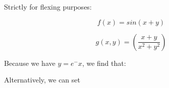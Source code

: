 \documentclass{article}
\begin{document}
Strictly for flexing purposes:

\[
    f(x) = sin(x+y)
\]

\[
    g(x,y) = (\frac{x+y}{x^2+y^2})
\]

Because we have $y=e^-x$, we find that:

Alternatively, we can set 
\end{document}

